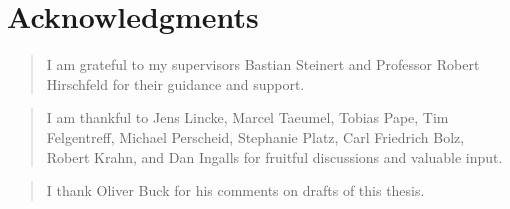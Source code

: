 \begingroup
\let\raggedsection\centering

\chapter*{Acknowledgments} \label{cha:acknowledgments}
\endgroup

\begin{quotation}
  \noindent I am grateful to my supervisors Bastian Steinert and Professor Robert Hirschfeld for their guidance and support. 
\end{quotation}

\begin{quotation}
  \noindent I am thankful to Jens Lincke, Marcel Taeumel, Tobias Pape, Tim Felgentreff, Michael Perscheid, Stephanie Platz, Carl Friedrich Bolz, Robert Krahn, and Dan Ingalls for fruitful discussions and valuable input.
\end{quotation}

\begin{quotation}
  \noindent I thank Oliver Buck for his comments on drafts of this thesis.
\end{quotation}

